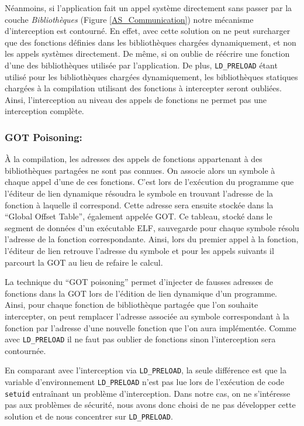 Néanmoins, si l'application fait un appel système directement sans
passer par la couche \textit{Bibliothèques} (Figure
\ref{AS_Communication}) notre mécanisme d'interception est
contourné. En effet, avec cette solution on ne peut surcharger que des
fonctions définies dans les bibliothèques chargées dynamiquement, et
non les appels systèmes directement. De même, si on oublie de réécrire
une fonction d'une des bibliothèques utilisée par l'application. De
plus, \texttt{LD\_PRELOAD} étant utilisé pour les bibliothèques
chargées dynamiquement, les bibliothèques statiques chargées à la
compilation utilisant des fonctions à intercepter seront
oubliées. Ainsi, l'interception au niveau des appels de fonctions ne
permet pas une interception complète.

\subsubsection{GOT Poisoning:}

À la compilation, les adresses des appels de fonctions appartenant à des bibliothèques partagées ne sont pas connues. On associe alors un symbole à chaque appel d'une de ces fonctions. C'est lors de l'exécution du programme que l'éditeur de lien dynamique résoudra le symbole en trouvant l'adresse de la fonction à laquelle il correspond. Cette adresse sera ensuite stockée dans la ``Global Offset Table''\citep{ELF}, également appelée GOT. Ce tableau, stocké dans le segment de données d'un exécutable ELF, sauvegarde pour chaque symbole résolu l'adresse de la fonction correspondante. Ainsi, lors du premier appel à la fonction, l'éditeur de lien retrouve l'adresse du symbole et pour les appels suivants il parcourt la GOT au lieu de refaire le calcul.

La technique du ``GOT poisoning'' \citep{GOT_poisoning} permet d'injecter de fausses adresses de fonctions dans la GOT lors de l'édition de lien dynamique d'un programme. Ainsi, pour chaque fonction de bibliothèque partagée que l'on souhaite intercepter, on peut remplacer l'adresse associée au symbole correspondant à la fonction par l'adresse d'une nouvelle fonction que l'on aura implémentée. Comme avec \texttt{LD\_PRELOAD} il ne faut pas oublier de fonctions sinon l'interception sera contournée.

En comparant avec l'interception via \texttt{LD\_PRELOAD}, la seule différence est que la variable d'environnement \texttt{LD\_PRELOAD} n'est pas lue lors de l'exécution de code \texttt{setuid} entraînant un problème d'interception. Dans notre cas, on ne s'intéresse pas aux problèmes de sécurité, nous avons donc choisi de ne pas développer cette solution et de nous concentrer sur \texttt{LD\_PRELOAD}.

\vspace{0.5cm}
